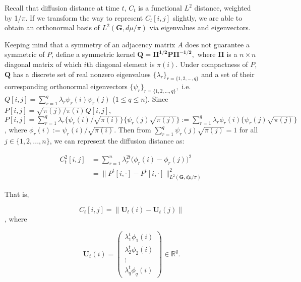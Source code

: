 \documentclass[12pt]{article}
\theoremstyle{definition}
\begin{document}
Recall that diffusion distance at time $t$, $C_{t}$ is a functional $L^2$ distance, weighted by 1/$\pi$. If we transform the way to represent $C_{t}[i,j]$ slightly, we are able to obtain an orthonormal basis of $L^{2}(\mathbf{G}, d\mu / \pi)$ via eigenvalues and eigenvectors. 
 
 Keeping mind that a symmetry of an adjacency matrix $A$ does not guarantee a symmetric of $P$, define a symmetric kernel $\boldsymbol{Q} = \boldsymbol{\Pi^{1/2} P \Pi^{-1/2}},$ where $\mathbf{\Pi}$ is a $n \times n$ diagonal matrix of which $i$th diagonal element is $\pi(i)$. Under compactness of $P$, $\boldsymbol{Q}$ has a discrete set of real nonzero eigenvalues $\{ \lambda_{r} \}_{r = \{1,2,...,q \}}$ and a set of their corresponding orthonormal eigenvectors $\{ \psi_{r} \}_{r = \{1,2,..., q \} },$ i.e. $Q[i,j] = \sum\limits_{r=1}^{q} \lambda_{r} \psi_{r}(i) \psi_{r}(j)$ ($1 \leq q \leq n$).  
 Since $P[i,j] = \sqrt{\pi(j) / \pi(i) } Q[i,j]$, $P[i,j]= \sum\limits_{r=1}^{q} \lambda_{r} \{ \psi_{r}(i) / \sqrt{\pi(i)}  \} \{ \psi_{r}(j) \sqrt{\pi(j)} \} := \sum\limits_{r=1}^{q} \lambda_{r} \phi_{r}(i) \{ \psi_{r}(j) \sqrt{\pi(j)} \}$, where $\phi_{r}(i) := \psi_{r}(i) / \sqrt{\pi(i)}$. Then from $\sum\limits_{r=1}^{q} \psi_{r}(j) \sqrt{\pi(j)} = 1$ for all $j \in \{1,2,...,n\}$, 
 we can represent the diffusion distance as: 
 
 \begin{equation}
 \begin{split}
 C^2_{t}[i,j] & = \sum\limits_{r=1}^{n} \lambda^{2t}_{r} \big( \phi_{r} (i) - \phi_{r}(j)   \big)^2   \\ &  = \parallel P^{t}[i, \cdot] - P^{t}[i, \cdot]  \parallel^2_{L^{2}(\boldsymbol{G}, d\mu / \pi)  }
 \end{split}
 \end{equation}
 
 That is,
 
 \begin{equation}
 C_{t}[i,j] = \parallel \boldsymbol{U}_{t}(i) - \boldsymbol{U}_{t}(j) \parallel
 \end{equation}
 , where 

\begin{equation} 
 \boldsymbol{U}_{t}(i) = \begin{pmatrix} \lambda^{t}_{1} \phi_{1}(i) \\ \lambda^{t}_{2} \phi_{2} (i)  \\ \vdots \\ \lambda^{t}_{q} \phi_{q}(i) \end{pmatrix} \in \mathbb{R}^{q}.
 \end{equation}
\end{document}
